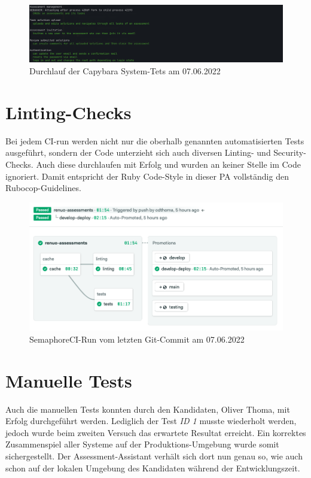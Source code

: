 \begin{figure}[H]
  \centering
  \includegraphics[width=\textwidth]{images/system-tests.png}
  \caption{\label{fig:system-tests}Durchlauf der Capybara System-Tets am 07.06.2022}
\end{figure}

\section{Linting-Checks}

Bei jedem CI-run werden nicht nur die oberhalb genannten automatisierten Tests ausgeführt, sondern der Code unterzieht sich auch diversen Linting- und Security-Checks.
Auch diese durchlaufen mit Erfolg und wurden an keiner Stelle im Code ignoriert. Damit entspricht der Ruby Code-Style in dieser PA vollständig den Rubocop-Guidelines.

\begin{figure}[H]
  \centering
  \includegraphics[width=\textwidth]{images/ci.png}
  \caption{\label{fig:semaphoreci}SemaphoreCI-Run vom letzten Git-Commit am 07.06.2022}
\end{figure}

\section{Manuelle Tests}

Auch die manuellen Tests konnten durch den Kandidaten, Oliver Thoma, mit Erfolg durchgeführt werden. Lediglich der Test \emph{ID 1} musste wiederholt werden, jedoch wurde beim zweiten Versuch
das erwartete Resultat erreicht. Ein korrektes Zusammenspiel aller Systeme auf der Produktions-Umgebung wurde somit sichergestellt.
Der Assessment-Assistant verhält sich dort nun genau so, wie auch schon auf der lokalen Umgebung des Kandidaten während der Entwicklungszeit.

